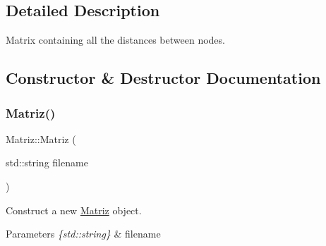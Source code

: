 \subsection{Detailed Description}
Matrix containing all the distances between nodes. 

\subsection{Constructor \& Destructor Documentation}
\mbox{\label{classMatriz_a388709cfee356a0c78b66e3f538e9318}} 
\subsubsection{\texorpdfstring{Matriz()}{Matriz()}}
{\footnotesize\ttfamily Matriz\+::\+Matriz (\begin{DoxyParamCaption}\item[{std\+::string}]{filename }\end{DoxyParamCaption})\hspace{0.3cm}{\ttfamily [inline]}}



Construct a new \hyperlink{classMatriz}{Matriz} object. 


\begin{DoxyParams}{Parameters}
{\em \{std\+::string\}} & filename \\
\hline
\end{DoxyParams}

